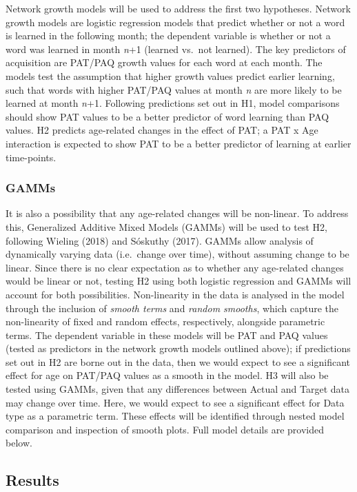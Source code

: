 \documentclass[
  man,mask,floatsintext]{apa6}
\begin{document}
Network growth models will be used to address the first two hypotheses. Network growth models are logistic regression models that predict whether or not a word is learned in the following month; the dependent variable is whether or not a word was learned in month \emph{n}+1 (learned vs.~not learned). The key predictors of acquisition are PAT/PAQ growth values for each word at each month. The models test the assumption that higher growth values predict earlier learning, such that words with higher PAT/PAQ values at month \emph{n} are more likely to be learned at month \emph{n}+1. Following predictions set out in H1, model comparisons should show PAT values to be a better predictor of word learning than PAQ values. H2 predicts age-related changes in the effect of PAT; a PAT x Age interaction is expected to show PAT to be a better predictor of learning at earlier time-points.

\hypertarget{gamms}{%
\subsubsection{GAMMs}\label{gamms}}

It is also a possibility that any age-related changes will be non-linear. To address this, Generalized Additive Mixed Models (GAMMs) will be used to test H2, following Wieling (2018) and Sóskuthy (2017). GAMMs allow analysis of dynamically varying data (i.e.~change over time), without assuming change to be linear. Since there is no clear expectation as to whether any age-related changes would be linear or not, testing H2 using both logistic regression and GAMMs will account for both possibilities. Non-linearity in the data is analysed in the model through the inclusion of \emph{smooth terms} and \emph{random smooths}, which capture the non-linearity of fixed and random effects, respectively, alongside parametric terms. The dependent variable in these models will be PAT and PAQ values (tested as predictors in the network growth models outlined above); if predictions set out in H2 are borne out in the data, then we would expect to see a significant effect for age on PAT/PAQ values as a smooth in the model. H3 will also be tested using GAMMs, given that any differences between Actual and Target data may change over time. Here, we would expect to see a significant effect for Data type as a parametric term. These effects will be identified through nested model comparison and inspection of smooth plots. Full model details are provided below.

\hypertarget{results}{%
\subsection{Results}\label{results}}
\end{document}
